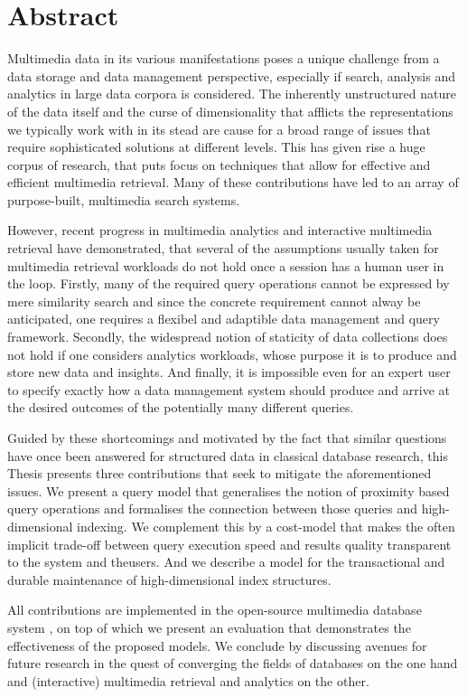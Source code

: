 
\chapter{Abstract}

Multimedia data in its various manifestations poses a unique challenge from a data storage and data management perspective, especially if search, analysis and analytics in large data corpora is considered. The inherently unstructured nature of the data itself and the curse of dimensionality that afflicts the representations we typically work with in its stead are cause for a broad range of issues that require sophisticated solutions at different levels. This has given rise a huge corpus of research, that puts focus on techniques that allow for effective and efficient multimedia retrieval. Many of these contributions have led to an array of purpose-built, multimedia search systems.

However, recent progress in multimedia analytics and interactive multimedia retrieval have demonstrated, that several of the assumptions usually taken for multimedia retrieval workloads do not hold once a session has a human user in the loop. Firstly, many of the required query operations cannot be expressed by mere similarity search and since the concrete requirement cannot alway be anticipated, one requires a flexibel and adaptible data management and query framework. Secondly, the widespread notion of staticity of data collections does not hold if one considers analytics workloads, whose purpose it is to produce and store new data and insights. And finally, it is impossible even for an expert user to specify exactly how a data management system should produce and arrive at the desired outcomes of the potentially many different queries.

Guided by these shortcomings and motivated by the fact that similar questions have once been answered for structured data in classical database research, this Thesis presents three contributions that seek to mitigate the aforementioned issues. We present a query model that generalises the notion of proximity based query operations and formalises the connection between those queries and high-dimensional indexing. We complement this by a cost-model that makes the often implicit trade-off between query execution speed and results quality transparent to the system and theusers. And we describe a model for the transactional and durable maintenance of high-dimensional index structures.

All contributions are implemented in the open-source multimedia database system \cottontail{}, on top of which we present an evaluation that demonstrates the effectiveness of the proposed models. We conclude by discussing avenues for future research in the quest of converging the fields of databases on the one hand and (interactive) multimedia retrieval and analytics on the other.